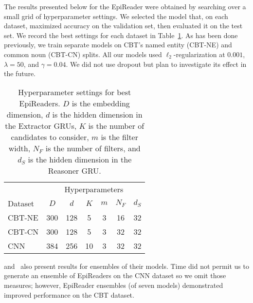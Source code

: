 \documentclass[11pt,letterpaper]{article}
\begin{document}
The results presented below for the EpiReader were obtained by searching over a small grid of hyperparameter settings. We selected the model that, on each dataset, maximized accuracy on the validation set, then evaluated it on the test set. We record the best settings for each dataset in Table~\ref{tab:hyper}. As has been done previously, we train separate models on CBT's named entity (CBT-NE) and common noun (CBT-CN) splits. All our models used $\ell_2$-regularization at $0.001$, $\lambda=50$, and $\gamma=0.04$. We did not use dropout but plan to investigate its effect in the future.
\begin{table}
  \caption{Hyperparameter settings for best EpiReaders. $D$ is the embedding dimension, $d$ is the hidden dimension in the Extractor GRUs, $K$ is the number of candidates to consider, $m$ is the filter width, $N_F$ is the number of filters, and $d_S$ is the hidden dimension in the Reasoner GRU.}
  \label{tab:hyper}
  \small
  \centering
  \begin{tabular}{lcccccc}
    \toprule
    {} & \multicolumn{6}{c}{Hyperparameters}          \\
 	\cmidrule{2-7}
    Dataset & $D$ & $d$ & $K$ & $m$ & $N_F$ & $d_S$            \\
    \midrule
    CBT-NE & 300 & 128 & 5 & 3 & 16 & 32 \\
    \midrule
    CBT-CN & 300 & 128 & 5 & 3 & 32 & 32 \\
    \midrule
    CNN & 384 & 256 & 10 & 3 & 32 & 32 \\ 
    \bottomrule
  \end{tabular}
\end{table}
 and~ also present results for ensembles of their models. Time did not permit us to generate an ensemble of EpiReaders on the CNN dataset so we omit those measures; however, EpiReader ensembles (of seven models) demonstrated improved performance on the CBT dataset.
\end{document}

